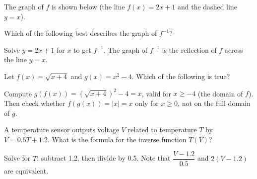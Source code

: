 \documentclass{ximera}
\begin{document}
\begin{problem}
The graph of $f$ is shown below (the line $f(x)=2x+1$ and the dashed line $y=x$).

\begin{center}
\end{center}

Which of the following best describes the graph of $f^{-1}$?
\begin{hint}
Solve $y=2x+1$ for $x$ to get $f^{-1}$. The graph of $f^{-1}$ is the reflection of $f$ across the line $y=x$.
\end{hint}
\begin{multipleChoice}
\end{multipleChoice}
\end{problem}

\begin{problem}
Let $f(x) = \sqrt{x+4}$ and $g(x) = x^2-4$. Which of the following is true?
\begin{hint}
Compute $g(f(x)) = (\sqrt{x+4})^2-4 = x$, valid for $x \geq -4$ (the domain of $f$). Then check whether $f(g(x)) = |x| = x$ only for $x \geq 0$, not on the full domain of $g$.
\end{hint}
\begin{multipleChoice}
\end{multipleChoice}
\end{problem}

\begin{problem}
A temperature sensor outputs voltage $V$ related to temperature $T$ by $V = 0.5T + 1.2$. What is the formula for the inverse function $T(V)$?
\begin{hint}
Solve for $T$: subtract 1.2, then divide by 0.5. Note that $\dfrac{V-1.2}{0.5}$ and $2(V-1.2)$ are equivalent.
\end{hint}
\begin{multipleChoice}
\end{multipleChoice}
\end{problem}
\end{document}
